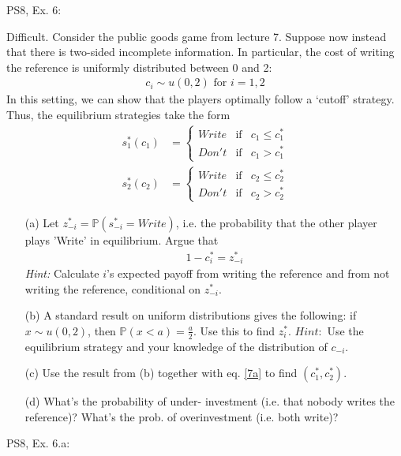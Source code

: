 \begin{frame}{PS8, Ex. 6: }
  \begin{multicols}{2}
    Difficult. Consider the public goods game from lecture 7. Suppose now instead that there is two-sided incomplete information. In particular, the cost of writing the reference is uniformly distributed between 0 and 2:
    \begin{align*}
      c_i\sim u(0,2)\text{ for }i=1,2
    \end{align*}
    In this setting, we can show that the players optimally follow a ‘cutoff’ strategy. Thus, the equilibrium strategies take the form
    \begin{align*}
      s_1^*(c_1)&=\left\{\begin{array}{rcl}
        Write & \text{if} & c_1\leq c_1^*\\
        Don't & \text{if} & c_1>c_1^*
        \end{array}\right.\\
      s_2^*(c_2)&=\left\{\begin{array}{rcl}
        Write & \text{if} & c_2\leq c_2^*\\
        Don't & \text{if} & c_2>c_2^*
        \end{array}\right.
    \end{align*}
    \vfill\null\columnbreak
    \begin{itemize}
      \item[(a)] Let $z_{-i}^* = \mathbb{P}(s_{-i}^*=Write)$, i.e. the probability that the other player plays 'Write' in equilibrium. Argue that
      \vspace{-18pt}
      \begin{align}
        1-c_i^*=z_{-i}^*\label{7a}
      \end{align}
      \textit{Hint:} Calculate $i$'s expected payoff from writing the reference and from not writing the reference, conditional on $z_{-i}^*$.
      \item[(b)] A standard result on uniform distributions gives the following: if $x\sim u(0, 2)$, then $\mathbb{P}(x<a)=\frac{a}{2}$. Use this to find $z_i^*$. $Hint:$ Use the equilibrium strategy and your knowledge of the distribution of $c_{-i}$.
      \item[(c)] Use the result from (b) together with eq. \eqref{7a} to find $(c_1^* , c_2^*)$.
      \item[(d)] What’s the probability of under- investment (i.e. that nobody writes the reference)? What’s the prob. of overinvestment (i.e. both write)?
    \end{itemize}
    \vfill\null
  \end{multicols}
\end{frame}

\begin{frame}{PS8, Ex. 6.a: }
  \begin{multicols}{2}
    \vfill\null\columnbreak
    \vfill\null
  \end{multicols}
\end{frame}
